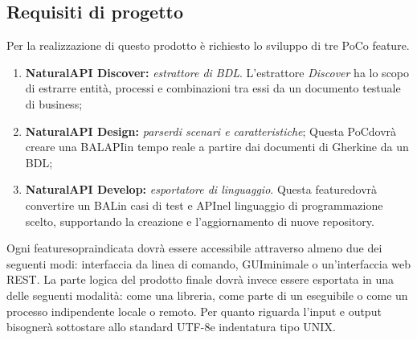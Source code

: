 \subsection{Requisiti di progetto}
Per la realizzazione di questo prodotto è richiesto lo sviluppo di tre PoC\glosp o feature\glo.
\begin{enumerate}
	\item \textbf{NaturalAPI Discover: }\textit{estrattore di BDL\glo}.
	L'estrattore \textit{Discover} ha lo scopo di estrarre entità, processi e combinazioni tra essi da un documento testuale di business;
	\item \textbf{NaturalAPI Design: }\textit{parser\glosp di scenari e caratteristiche};
	Questa PoC\glosp dovrà creare una BAL\glosp API\glosp in tempo reale a partire dai documenti di Gherkin\glosp e da un BDL\glo;
	\item \textbf{NaturalAPI Develop: }\textit{esportatore di linguaggio}.
	Questa feature\glosp dovrà convertire un BAL\glosp in casi di test e API\glosp nel linguaggio di programmazione scelto, supportando la creazione e l'aggiornamento di nuove repository\glo.
\end{enumerate}
Ogni feature\glosp sopraindicata dovrà essere accessibile attraverso almeno due dei seguenti modi: interfaccia da linea di comando, GUI\glosp minimale o un'interfaccia web REST\glo. La parte logica del prodotto finale dovrà invece essere esportata in una delle seguenti modalità: come una libreria, come parte di un eseguibile o come un processo indipendente locale o remoto. 
Per quanto riguarda l'input e output bisognerà sottostare allo standard UTF-8\glosp e indentatura tipo UNIX\glo. 

